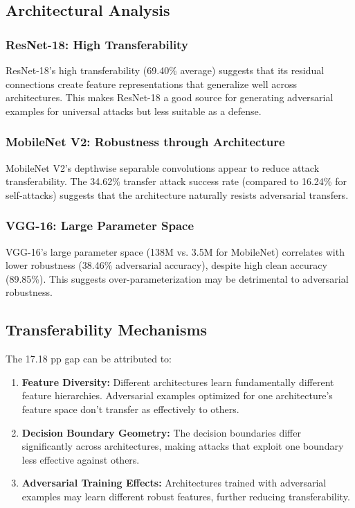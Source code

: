 \documentclass[10pt,conference]{IEEEtran}
\begin{document}
\subsection{Architectural Analysis}

\subsubsection{ResNet-18: High Transferability}

ResNet-18's high transferability (69.40\% average) suggests that its residual connections create feature representations that generalize well across architectures. This makes ResNet-18 a good source for generating adversarial examples for universal attacks but less suitable as a defense.

\subsubsection{MobileNet V2: Robustness through Architecture}

MobileNet V2's depthwise separable convolutions appear to reduce attack transferability. The 34.62\% transfer attack success rate (compared to 16.24\% for self-attacks) suggests that the architecture naturally resists adversarial transfers.

\subsubsection{VGG-16: Large Parameter Space}

VGG-16's large parameter space (138M vs. 3.5M for MobileNet) correlates with lower robustness (38.46\% adversarial accuracy), despite high clean accuracy (89.85\%). This suggests over-parameterization may be detrimental to adversarial robustness.

\subsection{Transferability Mechanisms}

The 17.18 pp gap can be attributed to:

\begin{enumerate}
    \item \textbf{Feature Diversity:} Different architectures learn fundamentally different feature hierarchies. Adversarial examples optimized for one architecture's feature space don't transfer as effectively to others.
    
    \item \textbf{Decision Boundary Geometry:} The decision boundaries differ significantly across architectures, making attacks that exploit one boundary less effective against others.
    
    \item \textbf{Adversarial Training Effects:} Architectures trained with adversarial examples may learn different robust features, further reducing transferability.
\end{enumerate}
\end{document}
